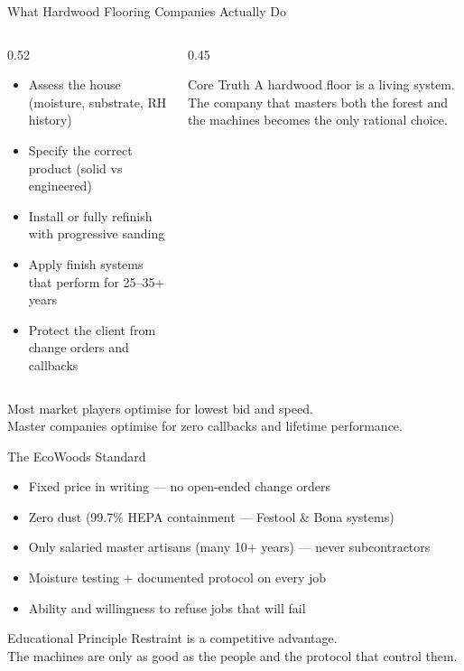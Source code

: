 \documentclass[aspectratio=169,10pt]{beamer}
\begin{document}
\begin{frame}{What Hardwood Flooring Companies Actually Do}
\begin{columns}[T]
\begin{column}{0.52\textwidth}
\begin{itemize}
  \item Assess the house (moisture, substrate, RH history)
  \item Specify the correct product (solid vs engineered)
  \item Install or fully refinish with progressive sanding
  \item Apply finish systems that perform for 25–35+ years
  \item Protect the client from change orders and callbacks
\end{itemize}
\end{column}
\begin{column}{0.45\textwidth}
\begin{alertblock}{Core Truth}
A hardwood floor is a living system.\\
The company that masters both the forest and the machines becomes the only rational choice.
\end{alertblock}
\end{column}
\end{columns}
\vspace{0.25cm}
\begin{center}
Most market players optimise for lowest bid and speed.\\
Master companies optimise for zero callbacks and lifetime performance.
\end{center}
\end{frame}

\begin{frame}{The EcoWoods Standard}
\begin{itemize}
  \item Fixed price in writing — no open-ended change orders
  \item Zero dust (99.7\% HEPA containment — Festool \& Bona systems)
  \item Only salaried master artisans (many 10+ years) — never subcontractors
  \item Moisture testing + documented protocol on every job
  \item Ability and willingness to refuse jobs that will fail
\end{itemize}
\vspace{0.2cm}
\begin{block}{Educational Principle}
Restraint is a competitive advantage.\\
The machines are only as good as the people and the protocol that control them.
\end{block}
\end{frame}
\end{document}
